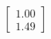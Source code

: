 \documentclass[preview]{standalone}
\begin{document}
\begin{align*}
\begin{bmatrix} 1.00 \\ 1.49 \end{bmatrix}
\end{align*}
\end{document}
